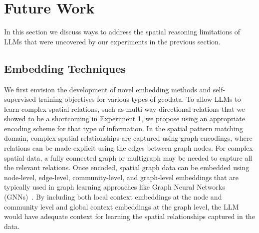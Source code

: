 \section{Future Work}
\label{section:future}

In this section we discuss ways to address the spatial reasoning limitations of LLMs that were uncovered by our experiments in the previous section.


\subsection{Embedding Techniques}
We first envision the development of novel embedding methods and self-supervised training objectives for various types of geodata.
%
%
To allow LLMs to learn complex spatial relations, such as multi-way directional relations that we showed to be a shortcoming in Experiment 1, we propose using an appropriate encoding scheme for that type of information.
In the spatial pattern matching domain, complex spatial relationships are captured using graph encodings, where relations can be made explicit using the edges between graph nodes.
For complex spatial data, a fully connected graph or multigraph may be needed to capture all the relevant relations. 
Once encoded, spatial graph data can be embedded using node-level, edge-level, community-level, and graph-level embeddings that are typically used in graph learning approaches like Graph Neural Networks (GNNs)~\cite{Bai2019,Krlevza2016,Liu2020Neural}.
By including both local context embeddings at the node and community level and global context embeddings at the graph level, the LLM would have adequate context for learning the spatial relationships captured in the data.

